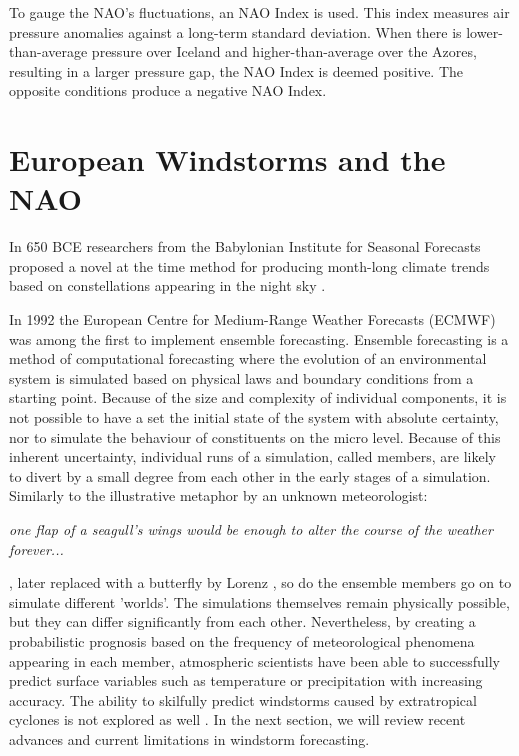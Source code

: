     To gauge the NAO's fluctuations, an NAO Index is used. This index measures air pressure anomalies against a long-term standard deviation. When there is lower-than-average pressure over Iceland and higher-than-average over the Azores, resulting in a larger pressure gap, the NAO Index is deemed positive. The opposite conditions produce a negative NAO Index.
    
    

\section{European Windstorms and the NAO}
    In 650 BCE researchers from the Babylonian Institute for Seasonal Forecasts proposed a novel at the time method for producing month-long climate trends based on constellations appearing in the night sky \citep{Ossendrijver+2021+223+258}. 
    
    In 1992 the European Centre for Medium-Range Weather Forecasts (ECMWF) was among the first to implement ensemble forecasting. Ensemble forecasting is a method of computational forecasting where the evolution of an environmental system is simulated based on physical laws and boundary conditions from a starting point. Because of the size and complexity of individual components, it is not possible to have a set the initial state of the system with absolute certainty, nor to simulate the behaviour of constituents on the micro level. Because of this inherent uncertainty, individual runs of a simulation, called members, are likely to divert by a small degree from each other in the early stages of a simulation. Similarly to the illustrative metaphor by an unknown meteorologist:
    
    \begin{displayquote}
        \textit{one flap of a seagull's wings would be enough to alter the course of the weather forever...}
    \end{displayquote}
    
    , later replaced with a butterfly by Lorenz \citep{Lorenz1963}, so do the ensemble members go on to simulate different 'worlds'. The simulations themselves remain physically possible, but they can differ significantly from each other. Nevertheless, by creating a probabilistic prognosis based on the frequency of meteorological phenomena appearing in each member, atmospheric scientists have been able to successfully predict surface variables such as temperature or precipitation with increasing accuracy. The ability to skilfully predict windstorms caused by extratropical cyclones is not explored as well \citep{Degenhardt2023}. In the next section, we will review recent advances and current limitations in windstorm forecasting.



